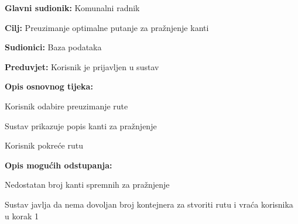 	\noindent {}
					\begin{packed_item}
	
						\item \textbf{Glavni sudionik: } Komunalni radnik
						\item  \textbf{Cilj:} Preuzimanje optimalne putanje za pražnjenje kanti
						\item  \textbf{Sudionici:} Baza podataka
						\item  \textbf{Preduvjet:} Korisnik je prijavljen u sustav
						\item  \textbf{Opis osnovnog tijeka:}
						
						\item[] \begin{packed_enum}
	
							\item Korisnik odabire preuzimanje rute
							\item Sustav prikazuje popis kanti za pražnjenje
							\item Korisnik pokreće rutu
						\end{packed_enum}
						
						\item  \textbf{Opis mogućih odstupanja:}
						
						\item[] \begin{packed_item}
	
							\item[1.a] Nedostatan broj kanti spremnih za pražnjenje 
							
							\item[] \begin{packed_enum}
								
								\item Sustav javlja da nema dovoljan broj kontejnera za stvoriti rutu i vraća korisnika u korak 1
								
							\end{packed_enum}
														
						\end{packed_item}
					\end{packed_item}


